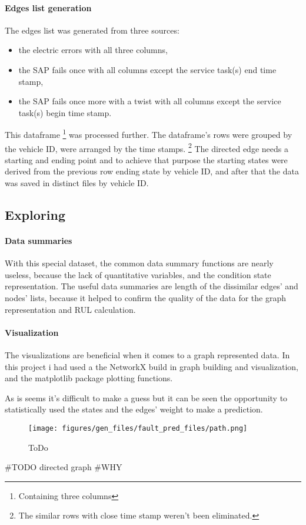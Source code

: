\paragraph{Edges list generation}
The edges list was generated from three sources: 
\begin{itemize}
	\item{the electric errors} with all three columns,
	\item{the SAP fails once} with all columns except the service task(s) end time stamp,
	\item{the SAP fails once more with a twist} with all columns except the service task(s) begin time stamp.
\end{itemize}

This dataframe \footnote{Containing three columns} was processed further. The dataframe's rows were grouped by the vehicle ID, were arranged by the time stamps.
\footnote{The similar rows with close time stamp weren't been eliminated.}
The directed edge needs a starting and ending point and to achieve that purpose the starting states were derived from the previous row ending state by vehicle ID, and after that the data was saved in distinct files by vehicle ID.
	\subsection{Exploring}
		\paragraph{Data summaries}
		With this special dataset, the common data summary functions are nearly useless, because the lack of quantitative variables, and the condition state representation.
		The useful data summaries are length of the dissimilar edges' and nodes' lists, because it helped to confirm the quality of the data for the graph representation and RUL calculation. 

		\paragraph{Visualization}
		The visualizations are beneficial when it comes to a graph represented data. In this project i had used a the NetworkX build in graph building and visualization, and the matplotlib package plotting functions.

		As is seems it's difficult to make a guess but it can be seen the opportunity to statistically used the states and the edges' weight to make a prediction.
			\begin{figure}[H]
			\centering
			\texttt{[image: figures/gen\_files/fault\_pred\_files/path.png]}
			\caption{ToDo} 
			\end{figure}
		\#TODO directed graph
\#WHY

